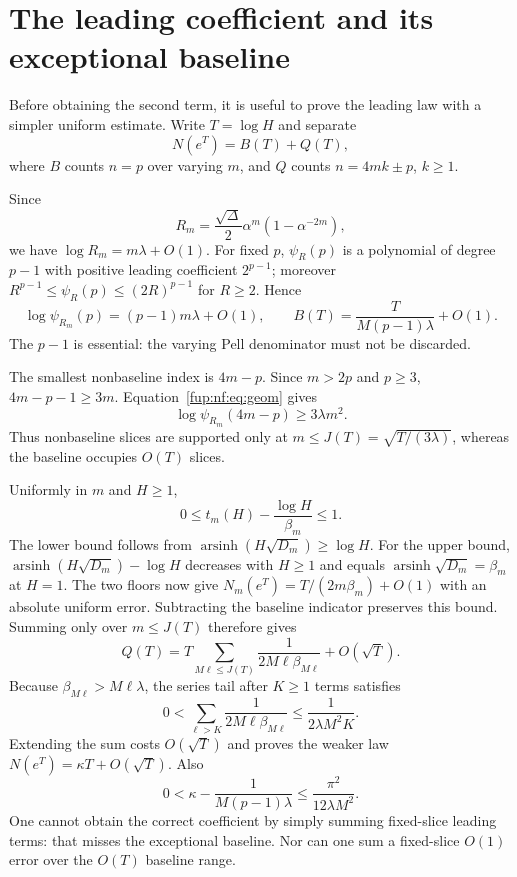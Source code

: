 \documentclass[11pt,letterpaper]{article}
\theoremstyle{definition}\newtheorem{definition}[theorem]{Definition}
\theoremstyle{remark}\newtheorem{remark}[theorem]{Remark}
\DeclareMathOperator{\arsinh}{arsinh}
\begin{document}
\section{The leading coefficient and its exceptional baseline}\label{fup:nf:sec:leading}
Before obtaining the second term, it is useful to prove the leading law with a simpler uniform estimate. Write $T=\log H$ and separate
\[
 N(e^T)=B(T)+Q(T),
\]
where $B$ counts $n=p$ over varying $m$, and $Q$ counts $n=4mk\pm p$, $k\ge1$.

Since
\[
 R_m=\frac{\sqrt\Delta}{2}\alpha^m(1-\alpha^{-2m}),
\]
we have $\log R_m=m\lambda+O(1)$. For fixed $p$, $\psi_R(p)$ is a polynomial of degree $p-1$ with positive leading coefficient $2^{p-1}$; moreover $R^{p-1}\le\psi_R(p)\le(2R)^{p-1}$ for $R\ge2$. Hence
\begin{equation}\label{fup:nf:eq:baseline}
 \log\psi_{R_m}(p)=(p-1)m\lambda+O(1),\qquad
 B(T)=\frac{T}{M(p-1)\lambda}+O(1).
\end{equation}
The $p-1$ is essential: the varying Pell denominator must not be discarded.

The smallest nonbaseline index is $4m-p$. Since $m>2p$ and $p\ge3$,
$4m-p-1\ge3m$. Equation~\eqref{fup:nf:eq:geom} gives
\[
 \log\psi_{R_m}(4m-p)\ge3\lambda m^2.
\]
Thus nonbaseline slices are supported only at $m\le J(T)=\sqrt{T/(3\lambda)}$, whereas the baseline occupies $O(T)$ slices.

Uniformly in $m$ and $H\ge1$,
\begin{equation}\label{fup:nf:eq:uniforminverse}
 0\le t_m(H)-\frac{\log H}{\beta_m}\le1.
\end{equation}
The lower bound follows from $\arsinh(H\sqrt{D_m})\ge\log H$. For the upper bound, $\arsinh(H\sqrt{D_m})-\log H$ decreases with $H\ge1$ and equals $\arsinh\sqrt{D_m}=\beta_m$ at $H=1$. The two floors now give $N_m(e^T)=T/(2m\beta_m)+O(1)$ with an absolute uniform error. Subtracting the baseline indicator preserves this bound. Summing only over $m\le J(T)$ therefore gives
\[
 Q(T)=T\sum_{M\ell\le J(T)}\frac{1}{2M\ell\beta_{M\ell}}+O(\sqrt T).
\]
Because $\beta_{M\ell}>M\ell\lambda$, the series tail after $K\ge1$ terms satisfies
\begin{equation}\label{fup:nf:eq:tail}
 0<\sum_{\ell>K}\frac1{2M\ell\beta_{M\ell}}
 \le\frac1{2\lambda M^2K}.
\end{equation}
Extending the sum costs $O(\sqrt T)$ and proves the weaker law $N(e^T)=\kappa T+O(\sqrt T)$. Also
\[
 0<\kappa-\frac1{M(p-1)\lambda}\le\frac{\pi^2}{12\lambda M^2}.
\]
One cannot obtain the correct coefficient by simply summing fixed-slice leading terms: that misses the exceptional baseline. Nor can one sum a fixed-slice $O(1)$ error over the $O(T)$ baseline range.
\end{document}
